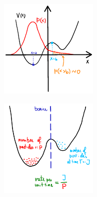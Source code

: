 \documentclass[../main.tex]{subfiles}
\begin{document}
\begin{figure}[H]
    \centering 
    \begin{subfigure}[b]{0.325\textwidth}
        \centering 
        \includegraphics[keepaspectratio, width = \linewidth]{../figures/fig2.4.1.2.a.pdf}
        \caption{}
        \label{fig2.4.1.2.a}
    \end{subfigure}
    \begin{subfigure}[b]{0.325\textwidth}
        \centering 
        \includegraphics[keepaspectratio, width = \linewidth]{../figures/fig2.4.1.2.b.pdf}
        \caption{}
        \label{fig2.4.1.2.b}
    \end{subfigure}
    \caption{}
    \label{fig2.4.1.2}
\end{figure}
\end{document}
